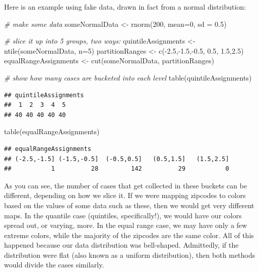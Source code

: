 \documentclass[
  openany]{book}
\newenvironment{Shaded}{\begin{snugshade}}{\end{snugshade}}
\newcommand{\AttributeTok}[1]{\textcolor[rgb]{0.77,0.63,0.00}{#1}}
\newcommand{\CommentTok}[1]{\textcolor[rgb]{0.56,0.35,0.01}{\textit{#1}}}
\newcommand{\DecValTok}[1]{\textcolor[rgb]{0.00,0.00,0.81}{#1}}
\newcommand{\FloatTok}[1]{\textcolor[rgb]{0.00,0.00,0.81}{#1}}
\newcommand{\FunctionTok}[1]{\textcolor[rgb]{0.00,0.00,0.00}{#1}}
\newcommand{\NormalTok}[1]{#1}
\newcommand{\OtherTok}[1]{\textcolor[rgb]{0.56,0.35,0.01}{#1}}
\newcommand{\SpecialCharTok}[1]{\textcolor[rgb]{0.00,0.00,0.00}{#1}}
\begin{document}
Here is an example using fake data, drawn in fact from a normal distribution:

\begin{Shaded}
\begin{Highlighting}[]
\CommentTok{\# make some data}
\NormalTok{someNormalData }\OtherTok{\textless{}{-}} \FunctionTok{rnorm}\NormalTok{(}\DecValTok{200}\NormalTok{, }\AttributeTok{mean=}\DecValTok{0}\NormalTok{, }\AttributeTok{sd =} \FloatTok{0.5}\NormalTok{)}

\CommentTok{\# slice it up into 5 groups, two ways:}
\NormalTok{quintileAssignments }\OtherTok{\textless{}{-}} \FunctionTok{ntile}\NormalTok{(someNormalData, }\AttributeTok{n=}\DecValTok{5}\NormalTok{)}
\NormalTok{partitionRanges }\OtherTok{\textless{}{-}} \FunctionTok{c}\NormalTok{(}\SpecialCharTok{{-}}\FloatTok{2.5}\NormalTok{,}\SpecialCharTok{{-}}\FloatTok{1.5}\NormalTok{,}\SpecialCharTok{{-}}\FloatTok{0.5}\NormalTok{, }\FloatTok{0.5}\NormalTok{, }\FloatTok{1.5}\NormalTok{,}\FloatTok{2.5}\NormalTok{)}
\NormalTok{equalRangeAssignments }\OtherTok{\textless{}{-}} \FunctionTok{cut}\NormalTok{(someNormalData, partitionRanges)}

\CommentTok{\# show how many cases are bucketed into each level}
\FunctionTok{table}\NormalTok{(quintileAssignments)}
\end{Highlighting}
\end{Shaded}

\begin{verbatim}
## quintileAssignments
##  1  2  3  4  5
## 40 40 40 40 40
\end{verbatim}

\begin{Shaded}
\begin{Highlighting}[]
\FunctionTok{table}\NormalTok{(equalRangeAssignments)}
\end{Highlighting}
\end{Shaded}

\begin{verbatim}
## equalRangeAssignments
## (-2.5,-1.5] (-1.5,-0.5]  (-0.5,0.5]   (0.5,1.5]   (1.5,2.5]
##           1          28         142          29           0
\end{verbatim}

As you can see, the number of cases that get collected in these buckets can be different, depending on how we slice it. If we were mapping zipcodes to colors based on the values of some data such as these, then we would get very different maps. In the quantile case (quintiles, specifically!), we would have our colors spread out, or varying, more. In the equal range case, we may have only a few extreme colors, while the majority of the zipcodes are the same color. All of this happened because our data distribution was bell-shaped. Admittedly, if the distribution were flat (also known as a uniform distribution), then both methods would divide the cases similarly.
\end{document}

